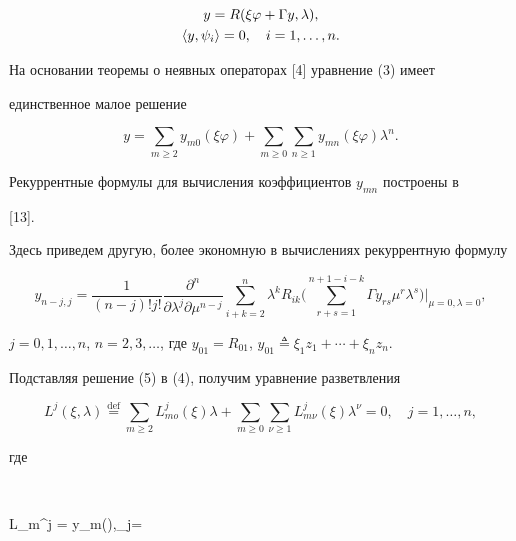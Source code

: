 \begin{gather}


y = R(\xi\varphi + \Gamma y, \lambda), \\


\la y,\psi_i\ra = 0, \quad i=1,\dotsc, n.


\end{gather}


На основании теоремы о неявных операторах [4] уравнение (3) имеет


единственное малое решение


\begin{equation}


y = \sum_{m\ge 2}y_{m0}(\xi\varphi) + \sum_{m\ge 0}\sum_{n\ge


1}y_{mn}(\xi\varphi)\lambda^n.


\end{equation}


Рекуррентные формулы для вычисления коэффициентов $y_{mn}$ построены в


[13].


Здесь приведем другую, более экономную в вычислениях рекуррентную формулу


$$


y_{n-j,j} = \frac{1}{(n-j)!j!}


\frac{\partial^n}{\partial\lambda^j\partial\mu^{n-j}}


\sum^n_{i+k=2}\lambda^kR_{ik}\bigg(\sum^{n+1-i-k}_{r+s=1}\Gamma


y_{rs}\mu^r\lambda^s\bigg)\bigg|_{\mu=0,\lambda=0},


$$


$j=0,1,\dotsc,n$, $n=2,3,\dotsc$, где $y_{01} = R_{01}$, $y_{01}


\triangleq \xi_1 z_1 + \dotsb + \xi_n z_n$.


Подставляя решение (5) в (4), получим уравнение разветвления


\begin{equation}


L^j(\xi,\lambda) \overset{\mathrm{def}}{=} \sum_{m\ge 2}L_{mo}^j(\xi)\lambda +


\sum_{m\ge 0}\sum_{\nu\ge 1}L_{m\nu}^j(\xi)\lambda^{\nu} = 0,\quad


j=1,\dotsc,n,


\end{equation}


где


$$


L_{m\nu}^j = \la y_{m\nu}(\xi\varphi),\psi_j\ra =


